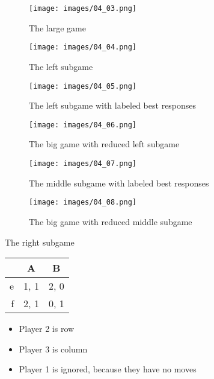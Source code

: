 \documentclass[
  ignorenonframetext,
]{beamer}
\providecommand{\tightlist}{%
  \setlength{\itemsep}{0pt}\setlength{\parskip}{0pt}}
\begin{document}
\begin{frame}
\begin{figure}
\centering
\texttt{[image: images/04\_03.png]}
\caption{The large game}
\end{figure}
\end{frame}

\begin{frame}
\begin{figure}
\centering
\texttt{[image: images/04\_04.png]}
\caption{The left subgame}
\end{figure}
\end{frame}

\begin{frame}
\begin{figure}
\centering
\texttt{[image: images/04\_05.png]}
\caption{The left subgame with labeled best responses}
\end{figure}
\end{frame}

\begin{frame}
\begin{figure}
\centering
\texttt{[image: images/04\_06.png]}
\caption{The big game with reduced left subgame}
\end{figure}
\end{frame}

\begin{frame}
\begin{figure}
\centering
\texttt{[image: images/04\_07.png]}
\caption{The middle subgame with labeled best responses}
\end{figure}
\end{frame}

\begin{frame}
\begin{figure}
\centering
\texttt{[image: images/04\_08.png]}
\caption{The big game with reduced middle subgame}
\end{figure}
\end{frame}

\begin{frame}{The right subgame}
\protect\hypertarget{the-right-subgame}{}
\begin{table}[!h]
\centering
\begin{tabular}[t]{>{}r|cc}
\toprule
 & A & B\\
\midrule
e & 1, 1 & 2, 0\\
f & 2, 1 & 0, 1\\
\bottomrule
\end{tabular}
\end{table}

\begin{itemize}
\tightlist
\item
  Player 2 is row
\item
  Player 3 is column
\item
  Player 1 is ignored, because they have no moves
\end{itemize}
\end{frame}
\end{document}
